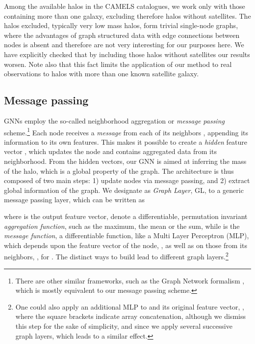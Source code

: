 \documentclass[twocolumn]{aastex631}
\begin{document}
Among the available halos in the CAMELS catalogues, we work only with those containing more than one galaxy, excluding therefore halos without satellites. The halos excluded,  typically very low mass halos, form trivial single-node graphs, where the advantages of graph structured data with edge connections between nodes is absent and therefore are not very interesting for our purposes here. We have explicitly checked that by including those halos without satellites our results worsen. Note also that this fact limits the application of our method to real observations to halos with more than one known satellite galaxy.



\subsection{Message passing}



\label{sec:messagepassing}

GNNs employ the so-called neighborhood aggregation or \textit{message passing} scheme.\footnote{There are other similar frameworks, such as the Graph Network formalism \citep{2018arXiv180601261B}, which is mostly equivalent to our message passing scheme.} Each node  receives a \textit{message} from each of its neighbors , appending its information to its own features. This makes it possible to create a \textit{hidden} feature vector , which updates the node and contains aggregated data from its neighborhood. From the hidden vectors, our GNN is aimed at inferring the mass of the halo, which is a global property of the graph. The architecture is thus composed of two main steps: 1) update nodes via message passing, and 2) extract global information of the graph. We designate as \textit{Graph Layer}, GL, to a generic message passing layer, which can be written as 

where  is the output feature vector,  denote a differentiable, permutation invariant \textit{aggregation function}, such as the maximum, the mean or the sum, while  is the \textit{message function}, a differentiable function, like a Multi Layer Perceptron (MLP), which depends upon the feature vector of the node, , as well as on those from its neighbors, , for . The distinct ways to build  lead to different graph layers.\footnote{One could also apply an additional MLP  to  and its original feature vector, , where the square brackets indicate array concatenation, although we dismiss this step for the sake of simplicity, and since we apply several successive graph layers, which leads to a similar effect.}
\end{document}
